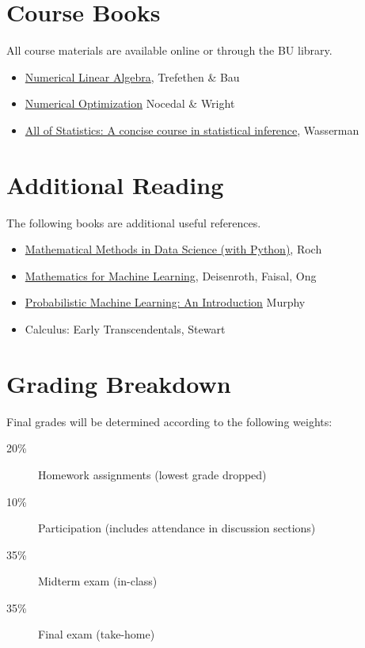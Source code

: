 \documentclass[11pt]{article}
\begin{document}
\section*{Course Books}
All course materials are available online or through the BU library.
\begin{itemize}
\item \href{https://www.stat.uchicago.edu/~lekheng/courses/309/books/Trefethen-Bau.pdf}{Numerical Linear Algebra}, Trefethen \& Bau 
\item \href{https://www.math.uci.edu/~qnie/Publications/NumericalOptimization.pdf}{Numerical Optimization} Nocedal \& Wright
\item  \href{library.bu.edu}{All of Statistics: A concise course in statistical inference}, Wasserman
\end{itemize}

\section*{Additional Reading}
The following books are additional useful references.
\begin{itemize}
\item \href{https://mmids-textbook.github.io/index.html}{Mathematical Methods in Data Science (with Python)}, Roch
\item \href{https://mml-book.github.io/book/mml-book.pdf}{Mathematics for Machine Learning}, Deisenroth, Faisal, Ong
\item \href{https://probml.github.io/pml-book/book1.html}{Probabilistic Machine Learning: An Introduction} Murphy
\item Calculus: Early Transcendentals, Stewart
\end{itemize}

\section*{Grading Breakdown}

Final grades will be determined according to the following weights:

\begin{description}
    \item[20\%] Homework assignments (lowest grade dropped)
    \item[10\%] Participation (includes attendance in discussion sections)
    \item[35\%] Midterm exam (in-class)
    \item[35\%] Final exam (take-home)
\end{description}
\end{document}
